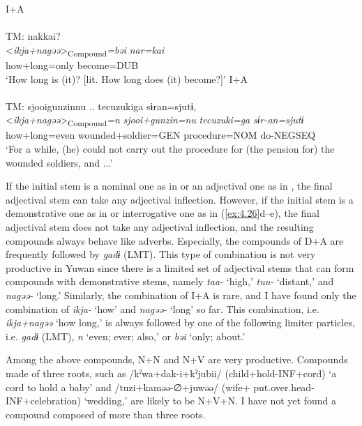 \ex I+A\hfill\relax[Co: 111113\_02.txt]\\\label{ex:4.26d}
\\
 {TM:}  {nakkai?}\\
  {<\textit{ikja+nagəə}>\textsubscript{Compound}\textit{=bəi}} {\itshape nar=kai}\\
  {how+long=only} {become=DUB}\\
  \glt{} ‘How long is (it)? [lit. How long does (it) become?]’
\ex I+A\hfill\relax[Co: 120415\_00.txt]\\\label{ex:4.26e}
\\
 {TM:}  {{\textbar}sjooigunzin{\textbar}nu ..} {{\textbar}tecuzuki{\textbar}ga} {sɨran=sjutɨ,}\\
  {<\textit{ikja+nagəə}>\textsubscript{Compound}\textit{=n}} {\itshape sjooi+gunzin=nu} {\itshape tecuzuki=ga} {\itshape sɨr-an=sjutɨ}\\
  {how+long=even} {wounded+soldier=GEN} {procedure=NOM} {do-NEGSEQ}\\
  \glt{} ‘For a while, (he) could not carry out the procedure for (the pension for) the wounded soldiers, and ...’
\z
\z

\noindent If the initial stem is a nominal one as in  or an adjectival one as in , the final adjectival stem can take any adjectival inflection. However, if the initial stem is a demonstrative one as in  or interrogative one as in (\ref{ex:4.26}d--e), the final adjectival stem does not take any adjectival inflection, and the resulting compounds always behave like adverbs. Especially, the compounds of D+A are frequently followed by \textit{gadɨ} (LMT). This type of combination is not very productive in Yuwan since there is a limited set of adjectival stems that can form compounds with demonstrative stems, namely \textit{taa-} ‘high,’ \textit{tuu-} ‘distant,’ and \textit{nagəə-} ‘long.’ Similarly, the combination of I+A is rare, and I have found only the combination of \textit{ikja-} ‘how’ and \textit{nagəə-} ‘long’ so far. This combination, i.e. \textit{ikja+nagəə} ‘how long,’ is always followed by one of the following limiter particles, i.e. \textit{gadɨ} (LMT), \textit{n} ‘even; ever; also,’ or \textit{bəi} ‘only; about.’

Among the above compounds, N+N and N+V are very productive. Compounds made of three roots, such as /kˀwa+dak-i+kˀjubii/ (child+hold-INF+cord) ‘a cord to hold a baby’ and /tuzi+kaməə-∅+juwəə/ (wife+ put.over.head-INF+celebration) ‘wedding,’ are likely to be N+V+N. I have not yet found a compound composed of more than three roots.

